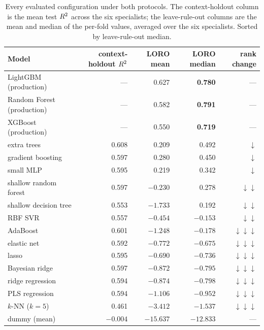 \begin{table}[htbp]\centering\small
\caption{Every evaluated configuration under both protocols. The
context-holdout column is the mean test $R^2$ across the six specialists;
the leave-rule-out columns are the mean and median of the per-fold values,
averaged over the six specialists. Sorted by leave-rule-out median.}
\label{tab:both_protocols}
\begin{tabular}{lrrrr}
\toprule
Model & context-holdout $R^2$ & LORO mean & LORO median & rank change \\
\midrule
LightGBM (production) & --- & 0.627 & \textbf{0.780} & --- \\
Random Forest (production) & --- & 0.582 & \textbf{0.791} & --- \\
XGBoost (production) & --- & 0.550 & \textbf{0.719} & --- \\
extra trees & 0.608 & 0.209 & 0.492 & $\downarrow$ \\
gradient boosting & 0.597 & 0.280 & 0.450 & $\downarrow$ \\
small MLP & 0.595 & 0.219 & 0.342 & $\downarrow$ \\
shallow random forest & 0.597 & $-0.230$ & 0.278 & $\downarrow\downarrow$ \\
shallow decision tree & 0.553 & $-1.733$ & 0.192 & $\downarrow\downarrow$ \\
RBF SVR & 0.557 & $-0.454$ & $-0.153$ & $\downarrow\downarrow$ \\
AdaBoost & 0.601 & $-1.248$ & $-0.178$ & $\downarrow\downarrow\downarrow$ \\
elastic net & 0.592 & $-0.772$ & $-0.675$ & $\downarrow\downarrow\downarrow$ \\
lasso & 0.595 & $-0.690$ & $-0.736$ & $\downarrow\downarrow\downarrow$ \\
Bayesian ridge & 0.597 & $-0.872$ & $-0.795$ & $\downarrow\downarrow\downarrow$ \\
ridge regression & 0.594 & $-0.874$ & $-0.798$ & $\downarrow\downarrow\downarrow$ \\
PLS regression & 0.594 & $-1.106$ & $-0.952$ & $\downarrow\downarrow\downarrow$ \\
$k$-NN ($k=5$) & 0.461 & $-3.412$ & $-1.537$ & $\downarrow\downarrow\downarrow$ \\
dummy (mean) & $-0.004$ & $-15.637$ & $-12.833$ & --- \\
\bottomrule
\end{tabular}
\end{table}

